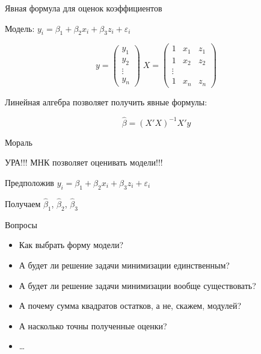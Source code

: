 \documentclass[ignorenonframetext,]{beamer}
\begin{document}
\begin{frame}{Явная формула для оценок коэффициентов}

Модель: \(y_i=\beta_1 + \beta_2 x_i +\beta_3 z_i +\varepsilon_i\)

\[
y=\begin{pmatrix}
y_1 \\
y_2 \\
\vdots \\
y_n 
\end{pmatrix}
\; X=\begin{pmatrix}
1 & x_1 & z_1 \\
1 & x_2 & z_2 \\
\vdots \\
1 & x_n & z_n 
\end{pmatrix}
\]

Линейная алгебра позволяет получить явные формулы:

\[
\hat{\beta}=(X'X)^{-1}X'y
\]

\end{frame}

\begin{frame}{Мораль}

УРА!!! МНК позволяет оценивать модели!!!

Предположив \(y_i=\beta_1 + \beta_2 x_i +\beta_3 z_i +\varepsilon_i\)

Получаем \(\hat{\beta}_1\), \(\hat{\beta}_2\), \(\hat{\beta}_3\)

\end{frame}

\begin{frame}{Вопросы}

\begin{itemize}
\item
  Как выбрать форму модели?
\item
  А будет ли решение задачи минимизации единственным?
\item
  А будет ли решение задачи минимизации вообще существовать?
\item
  А почему сумма квадратов остатков, а не, скажем, модулей?
\item
  А насколько точны полученные оценки?
\item
  \ldots{}
\end{itemize}

\end{frame}
\end{document}

